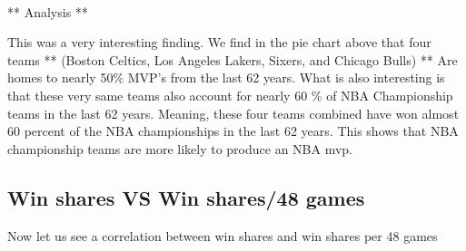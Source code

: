 \documentclass[11pt]{article}
\begin{document}
    \begin{center}
    \end{center}
    { \hspace*{\fill} \\}
    
    ** Analysis **

This was a very interesting finding. We find in the pie chart above that
four teams ** (Boston Celtics, Los Angeles Lakers, Sixers, and Chicago
Bulls) ** Are homes to nearly 50\% MVP's from the last 62 years. What is
also interesting is that these very same teams also account for nearly
60 \% of NBA Championship teams in the last 62 years. Meaning, these
four teams combined have won almost 60 percent of the NBA championships
in the last 62 years. This shows that NBA championship teams are more
likely to produce an NBA mvp.

\subsection{Win shares VS Win shares/48
games}\label{win-shares-vs-win-shares48-games}

Now let us see a correlation between win shares and win shares per 48
games
\end{document}
